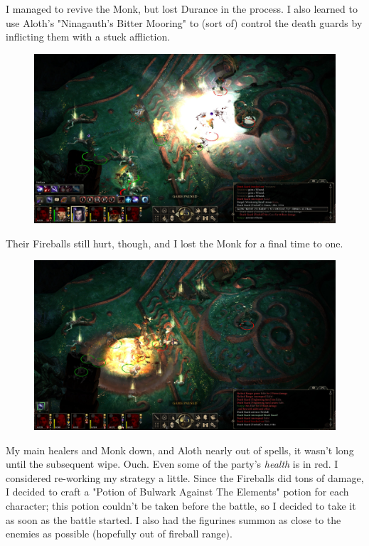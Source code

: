 \documentclass{article}
\begin{document}
I managed to revive the Monk, but lost Durance in the process.  I also learned to use Aloth's "Ninagauth's Bitter Mooring" to (sort of) control the death guards by inflicting them with a stuck affliction.

\begin{figure}
\includegraphics[scale=0.33]{files/blog/2018_11_25_pillars_of_eternity_path_of_the_damned_act_ii/2018_11_25_fampyr08.jpg}
\end{figure}

Their Fireballs still hurt, though, and I lost the Monk for a final time to one.

\begin{figure}
\includegraphics[scale=0.33]{files/blog/2018_11_25_pillars_of_eternity_path_of_the_damned_act_ii/2018_11_25_fampyr09.jpg}
\end{figure}

My main healers and Monk down, and Aloth nearly out of spells, it wasn't long until the subsequent wipe.  Ouch.  Even some of the party's \emph{health} is in red.  I considered re-working my strategy a little.  Since the Fireballs did tons of damage, I decided to craft a "Potion of Bulwark Against The Elements" potion for each character; this potion couldn't be taken before the battle, so I decided to take it as soon as the battle started.  I also had the figurines summon as close to the enemies as possible (hopefully out of fireball range).
\end{document}
